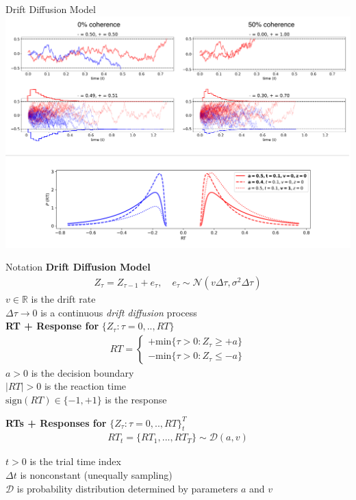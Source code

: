 \documentclass[8pt]{beamer}
\begin{document}
\begin{frame}{Drift Diffusion Model}
    \includegraphics[width=1\textwidth]{docs/slides/figures/ddm-intuition.png}
\end{frame}

\begin{frame}{Notation}
\textbf{Drift Diffusion Model}
\begin{align}
    Z_\tau = Z_{\tau-1} + e_\tau, \quad e_\tau \sim \mathcal{N}(v\Delta \tau, \sigma^2 \Delta \tau)
\end{align}
$v \in \mathbb{R}$ is the drift rate\\
$\Delta \tau \to 0$ is a continuous \textit{drift diffusion} process\\

\vspace{.25cm}
\textbf{RT + Response for} $\{Z_\tau: \tau=0, .., RT\}$
\begin{align}
    RT = \begin{cases}
        + \text{min}\{\tau>0: Z_\tau \ge +a\}\\
        - \text{min}\{\tau>0: Z_\tau \le -a\}
        \end{cases}
\end{align}
$a>0$ is the decision boundary\\
$|RT|> 0$ is the reaction time\\
$\text{sign}(RT) \in \{-1, +1\}$ is the response

\vspace{.25cm}
\textbf{RTs + Responses for} $\{Z_\tau: \tau=0, .., RT\}_t^T$
\begin{align}
    RT_t = \{RT_1, ..., RT_T\} \sim \mathcal{D}(a, v)
\end{align}

$t > 0$ is the trial time index\\
$\Delta t$ is nonconstant (unequally sampling)\\
$\mathcal{D}$ is probability distribution determined by parameters $a$ and $v$
\end{frame}
\end{document}
